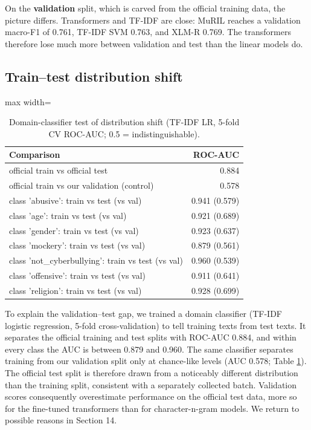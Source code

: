 \documentclass[10pt,twocolumn]{article}
\begin{document}
On the \textbf{validation} split, which is carved from the official training data, the picture differs. Transformers and
TF-IDF are close: MuRIL reaches a validation macro-F1 of 0.761, TF-IDF SVM
0.763, and XLM-R 0.769. The transformers therefore
lose much more between validation and test than the linear models do.

\subsection{Train--test distribution shift}

\begin{table}[t]
\centering
\small
\caption{Domain-classifier test of distribution shift (TF-IDF LR, 5-fold CV ROC-AUC; 0.5 = indistinguishable).}
\label{tab:shift}
\begin{adjustbox}{max width=\textwidth}\begin{tabular}{lr}
\toprule
Comparison & ROC-AUC \\
\midrule
official train vs official test & 0.884 \\
official train vs our validation (control) & 0.578 \\
class 'abusive': train vs test (vs val) & 0.941 (0.579) \\
class 'age': train vs test (vs val) & 0.921 (0.689) \\
class 'gender': train vs test (vs val) & 0.923 (0.637) \\
class 'mockery': train vs test (vs val) & 0.879 (0.561) \\
class 'not\_cyberbullying': train vs test (vs val) & 0.960 (0.539) \\
class 'offensive': train vs test (vs val) & 0.911 (0.641) \\
class 'religion': train vs test (vs val) & 0.928 (0.699) \\
\bottomrule
\end{tabular}\end{adjustbox}
\end{table}


To explain the validation--test gap, we trained a domain classifier (TF-IDF logistic regression, 5-fold
cross-validation) to tell training texts from test texts. It separates the official training and test splits with
ROC-AUC 0.884, and within every class the AUC is between 0.879 and
0.960. The same classifier separates training from our validation split only at chance-like levels
(AUC 0.578; Table \ref{tab:shift}). The official test split is therefore drawn from a noticeably
different distribution than the training split, consistent with a separately collected batch. Validation scores
consequently overestimate performance on the official test data, more so for the fine-tuned transformers than for
character-n-gram models. We return to possible reasons in Section 14.
\end{document}
